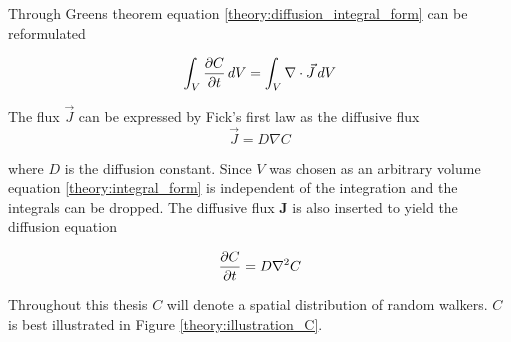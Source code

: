 \noindent Through Greens theorem equation \eqref{theory:diffusion_integral_form} can be reformulated

\begin{equation}\label{theory:integral_form}
 \int_V \frac{\partial C}{\partial t}\,dV = \int_V\nabla\cdot\vec{J}\,dV
\end{equation}

\noindent The flux $\vec{J}$ can be expressed by Fick's first law as the diffusive flux 
\begin{equation}
 \vec J = D\nabla C
\end{equation}

\noindent where $D$ is the diffusion constant. Since $V$ was chosen as an arbitrary volume equation \eqref{theory:integral_form} is independent of the integration and the integrals can be dropped. 
The diffusive flux $\mathbf{J}$ is also inserted to yield the diffusion equation

\begin{equation}\label{theory:diffusion_equation}
 \frac{\partial C}{\partial t} = D\nabla^2 C
\end{equation}

\noindent Throughout this thesis $C$ will denote a spatial distribution of random walkers. 
$C$ is best illustrated in Figure \ref{theory:illustration_C}.

